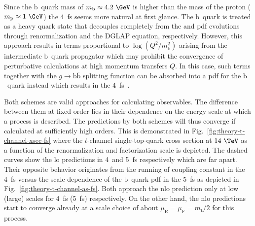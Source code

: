 Since the $\mathrm{b}$~quark mass of $m_\mathrm{b}\approx4.2~\GeV$ is higher than the mass of the proton ($m_\mathrm{p}\approx1~\GeV$) the 4~\gls{fs} seems more natural at first glance. The $\mathrm{b}$~quark is treated as a heavy quark state that decouples completely from the \as and \gls{pdf} evolutions through renormalization and the DGLAP equation, respectively. However, this approach results in terms proportional to $\log(Q^2/m_\mathrm{b}^2)$ arising from the intermediate $\mathrm{b}$~quark propagator which may prohibit the convergence of perturbative calculations at high momentum transfers $Q$. In this case, such terms together with the $g\to\mathrm{b}\bar{\mathrm{b}}$ splitting function can be absorbed into a \gls{pdf} for the $\mathrm{b}$~quark instead which results in the 4~\gls{fs}~\cite{Maltoni:2012pa}.

Both schemes are valid approaches for calculating observables. The difference between them at fixed order lies in their dependence on the energy scale at which a process is described. The predictions by both schemes will thus converge if calculated at sufficiently high orders. This is demonstrated in Fig.~\ref{fig:theory-t-channel-xsec-fs} where the $t$-channel single-top-quark cross section at $14~\TeV$ as a function of the renormalization and factorization scale is depicted. The dashed curves show the \gls{lo} predictions in 4~and 5~\gls{fs} respectively which are far apart. Their opposite behavior originates from the running of coupling constant \as in the 4~\gls{fs} versus the scale dependence of the $\mathrm{b}$~quark \gls{pdf} in the 5~\gls{fs} as depicted in Fig.~\ref{fig:theory-t-channel-as-fs}. Both approach the \gls{nlo} prediction only at low (large) scales for 4~\gls{fs} (5~\gls{fs}) respectively. On the other hand, the \gls{nlo} predictions start to converge already at a scale choice of about $\mu_\mathrm{R}=\mu_\mathrm{F}= m_\mathrm{t}/2$ for this process.

